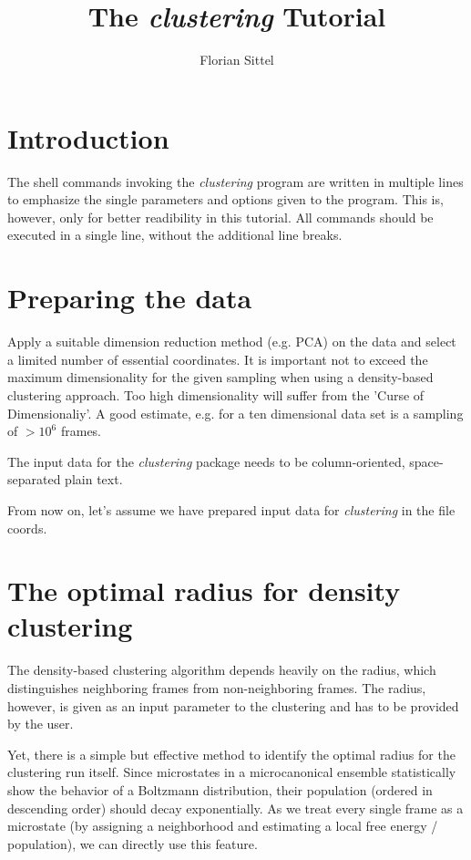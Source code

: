 \documentclass[12pt,a4paper,twoside,english,fleqn]{article}
\begin{document}
\title{The \emph{clustering} Tutorial}
\author{Florian Sittel}
\maketitle

\section{Introduction}
The shell commands invoking the \emph{clustering} program are written in multiple lines to emphasize the
single parameters and options given to the program.
This is, however, only for better readibility in this tutorial.
All commands should be executed in a single line, without the additional line breaks.


\section{Preparing the data}
Apply a suitable dimension reduction method (e.g. PCA) on the data and select a
limited number of essential coordinates.
It is important not to exceed the maximum dimensionality for the given sampling
when using a density-based clustering approach.
Too high dimensionality will suffer from the 'Curse of Dimensionaliy'.
A good estimate, e.g. for a ten dimensional data set is a sampling of $> 10^6$ frames.

The input data for the \emph{clustering} package needs to be column-oriented, space-separated plain text.

From now on, let's assume we have prepared input data for \emph{clustering} in the file {\ttfamily coords}.


\section{The optimal radius for density clustering}
The density-based clustering algorithm depends heavily on the radius, which distinguishes
neighboring frames from non-neighboring frames.
The radius, however, is given as an input parameter to the clustering and has to be provided by the user.

Yet, there is a simple but effective method to identify the optimal radius for the clustering run itself.
Since microstates in a microcanonical ensemble statistically show the behavior of a Boltzmann distribution, their population
(ordered in descending order) should decay exponentially.
As we treat every single frame as a microstate (by assigning a neighborhood and estimating a local free energy / population),
we can directly use this feature.
\end{document}
